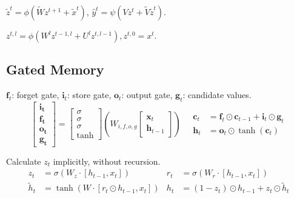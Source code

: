 \begin{definition}
    \(\tilde{z}^t = \phi(\tilde W z^{t+1} + \tilde x^t)\), \(\hat y^t = \psi(Vz^t + \tilde V \tilde z^t)\).
\end{definition}

\begin{definition}
    \(z^{t, l} = \phi(W^l z^{t-1, l} + U^l z^{t, l-1}), z^{t, 0} = x^t\).
\end{definition}

\subsection{Gated Memory}

\begin{definition}[LSTM]
\(\mathbf{f}_t\): forget gate, \(\mathbf{i}_t\): store gate, \(\mathbf{o}_t\): output gate, \(\mathbf{g}_t\): candidate values.
\[
\mathbf{
    \begin{bmatrix}
        \mathbf{i}_t \\
        \mathbf{f}_t \\
        \mathbf{o}_t \\
        \mathbf{g}_t
    \end{bmatrix}
} = 
\begin{bmatrix}
    \sigma \\
    \sigma \\
    \sigma \\
    \tanh
\end{bmatrix}
\left( W_{i, f, o, g}
\begin{bmatrix}
    \mathbf{x}_t \\  %
    \mathbf{h}_{t-1} %
\end{bmatrix}
\right)
\quad
\begin{aligned}
\mathbf{c}_t &= \mathbf{f}_t \odot \mathbf{c}_{t-1} + \mathbf{i}_t \odot \mathbf{g}_t \\
\mathbf{h}_t &= \mathbf{o}_t \odot \tanh(\mathbf{c}_t)
\end{aligned}
\]
\end{definition}

\begin{definition}[GRU]
    Calculate \(z_t\) implicitly, without recursion.  
    \begin{align*}
        z_t &= \sigma(W_z \cdot [h_{t-1}, x_t])
        & r_t &= \sigma(W_r \cdot [h_{t-1}, x_t]) \\
        \tilde{h}_t &= \tanh(W \cdot [r_t \odot h_{t-1}, x_t])
        & h_t &= (1 - z_t) \odot h_{t-1} + z_t \odot \tilde{h}_t
    \end{align*}
\end{definition}

